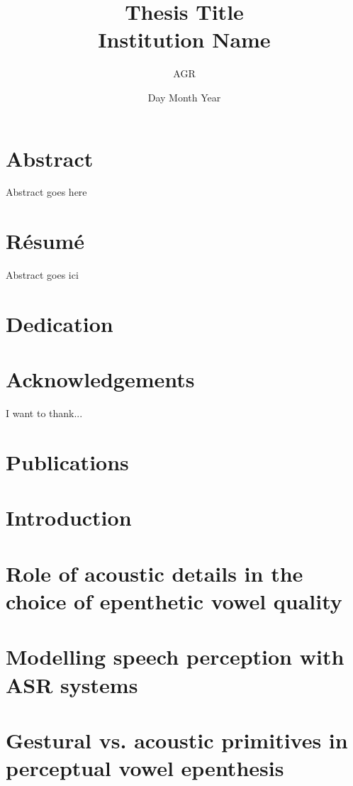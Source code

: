 \documentclass[12pt, twoside]{report}
\title{
	{Thesis Title}\\
	{\large Institution Name}\\
}
\author{AGR}
\date{Day Month Year}
\begin{document}
\maketitle

\chapter*{Abstract}
Abstract goes here

\chapter*{Résumé}
Abstract goes ici

\chapter*{Dedication}


\chapter*{Acknowledgements}
I want to thank...

\chapter*{Publications}


\tableofcontents
\linenumbers
\chapter{Introduction}
\setcounter{page}{1}


\chapter{Role of acoustic details in the choice of epenthetic vowel quality}


\chapter{Modelling speech perception with ASR systems}


\chapter{{\color{red}Gestural vs. acoustic primitives in perceptual vowel epenthesis}}

\end{document}
